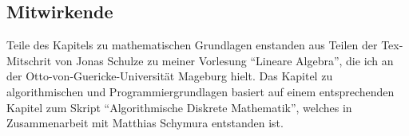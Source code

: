 \subsection*{Mitwirkende}

Teile des Kapitels zu mathematischen Grundlagen enstanden aus Teilen der Tex-Mitschrit von Jonas Schulze zu meiner Vorlesung ``Lineare Algebra'', die ich an der Otto-von-Guericke-Universität Mageburg hielt. Das Kapitel zu algorithmischen und Programmiergrundlagen basiert auf einem entsprechenden Kapitel zum Skript ``Algorithmische Diskrete Mathematik'', welches in Zusammenarbeit mit Matthias Schymura entstanden ist. 
